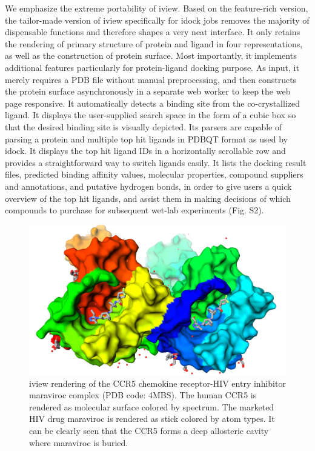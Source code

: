 \documentclass{bioinfo}
\begin{document}
\begin{methods}
We emphasize the extreme portability of iview. Based on the feature-rich version, the tailor-made version of iview specifically for idock jobs removes the majority of dispensable functions and therefore shapes a very neat interface. It only retains the rendering of primary structure of protein and ligand in four representations, as well as the construction of protein surface. Most importantly, it implements additional features particularly for protein-ligand docking purpose. As input, it merely requires a PDB file without manual preprocessing, and then constructs the protein surface asynchronously in a separate web worker to keep the web page responsive. It automatically detects a binding site from the co-crystallized ligand. It displays the user-supplied search space in the form of a cubic box so that the desired binding site is visually depicted. Its parsers are capable of parsing a protein and multiple top hit ligands in PDBQT format as used by idock. It displays the top hit ligand IDs in a horizontally scrollable row and provides a straightforward way to switch ligands easily. It lists the docking result files, predicted binding affinity values, molecular properties, compound suppliers and annotations, and putative hydrogen bonds, in order to give users a quick overview of the top hit ligands, and assist them in making decisions of which compounds to purchase for subsequent wet-lab experiments (Fig. S2).

\end{methods}

\begin{figure}%
\centerline{\includegraphics[width=\linewidth]{4MBS.png}}
\caption{iview rendering of the CCR5 chemokine receptor-HIV entry inhibitor maraviroc complex \citep{1348} (PDB code: 4MBS). The human CCR5 is rendered as molecular surface colored by spectrum. The marketed HIV drug maraviroc is rendered as stick colored by atom types. It can be clearly seen that the CCR5 forms a deep allosteric cavity where maraviroc is buried.}\label{fig:4MBS}
\end{figure}


%
%
%
%
%
%


\end{document}

